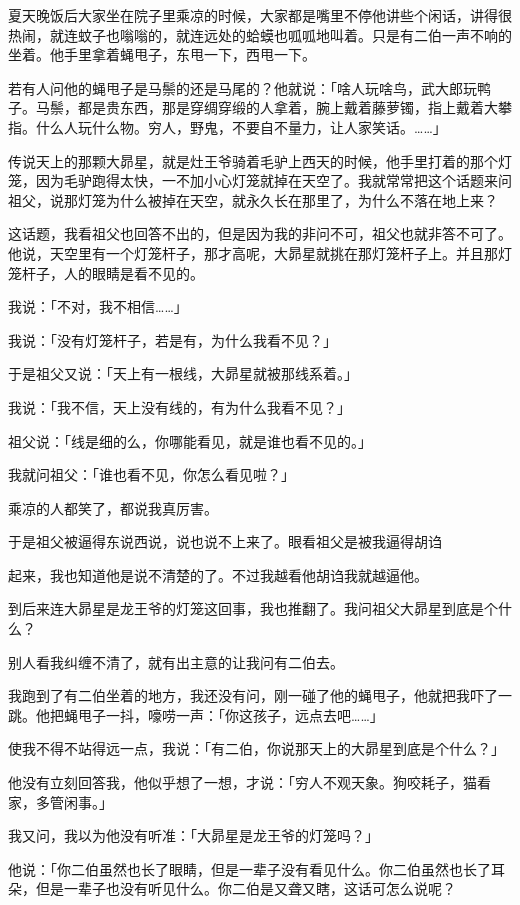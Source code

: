 \documentclass[UTF8]{ctexart}
\begin{document}
夏天晚饭后大家坐在院子里乘凉的时候，大家都是嘴里不停他讲些个闲话，讲得很热闹，就连蚊子也嗡嗡的，就连远处的蛤蟆也呱呱地叫着。只是有二伯一声不响的坐着。他手里拿着蝇甩子，东甩一下，西甩一下。

若有人问他的蝇甩子是马鬃的还是马尾的？他就说：「啥人玩啥鸟，武大郎玩鸭子。马鬃，都是贵东西，那是穿绸穿缎的人拿着，腕上戴着藤萝镯，指上戴着大攀指。什么人玩什么物。穷人，野鬼，不要自不量力，让人家笑话。……」

传说天上的那颗大昴星，就是灶王爷骑着毛驴上西天的时候，他手里打着的那个灯笼，因为毛驴跑得太快，一不加小心灯笼就掉在天空了。我就常常把这个话题来问祖父，说那灯笼为什么被掉在天空，就永久长在那里了，为什么不落在地上来？

这话题，我看祖父也回答不出的，但是因为我的非问不可，祖父也就非答不可了。他说，天空里有一个灯笼杆子，那才高呢，大昴星就挑在那灯笼杆子上。并且那灯笼杆子，人的眼睛是看不见的。

我说：「不对，我不相信……」

我说：「没有灯笼杆子，若是有，为什么我看不见？」

于是祖父又说：「天上有一根线，大昴星就被那线系着。」

我说：「我不信，天上没有线的，有为什么我看不见？」

祖父说：「线是细的么，你哪能看见，就是谁也看不见的。」

我就问祖父：「谁也看不见，你怎么看见啦？」

乘凉的人都笑了，都说我真厉害。

于是祖父被逼得东说西说，说也说不上来了。眼看祖父是被我逼得胡诌

起来，我也知道他是说不清楚的了。不过我越看他胡诌我就越逼他。

到后来连大昴星是龙王爷的灯笼这回事，我也推翻了。我问祖父大昴星到底是个什么？

别人看我纠缠不清了，就有出主意的让我问有二伯去。

我跑到了有二伯坐着的地方，我还没有问，刚一碰了他的蝇甩子，他就把我吓了一跳。他把蝇甩子一抖，嚎唠一声：「你这孩子，远点去吧……」

使我不得不站得远一点，我说：「有二伯，你说那天上的大昴星到底是个什么？」

他没有立刻回答我，他似乎想了一想，才说：「穷人不观天象。狗咬耗子，猫看家，多管闲事。」

我又问，我以为他没有听准：「大昴星是龙王爷的灯笼吗？」

他说：「你二伯虽然也长了眼睛，但是一辈子没有看见什么。你二伯虽然也长了耳朵，但是一辈子也没有听见什么。你二伯是又聋又瞎，这话可怎么说呢？
\end{document}

